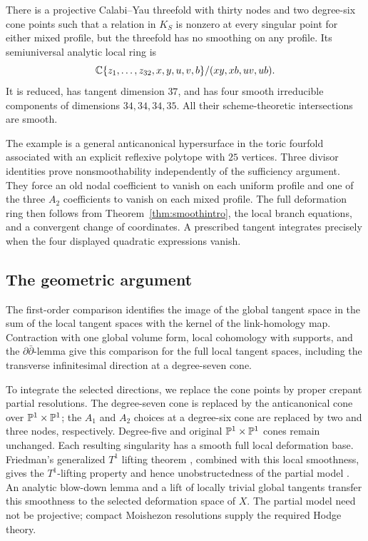 \begin{samepage}
\begin{thmletter}\label{thm:counterintro}
There is a projective Calabi--Yau threefold with thirty nodes and two
degree-six cone points such that a relation in $K_S$ is nonzero at every
singular point for either mixed profile, but the threefold has no
smoothing on any profile.  Its semiuniversal analytic local ring is
\[
 \mathbb{C}\{z_1,\ldots,z_{32},x,y,u,v,b\}/(xy,xb,uv,ub).
\]
It is reduced, has tangent dimension $37$, and has four smooth
irreducible components of dimensions $34,34,34,35$.  All their
scheme-theoretic intersections are smooth.
\end{thmletter}
\end{samepage}

The example is a general anticanonical hypersurface in the toric
fourfold associated with an explicit reflexive polytope with $25$
vertices.  Three divisor identities prove nonsmoothability independently
of the sufficiency argument.  They force an old nodal coefficient to
vanish on each uniform profile and one of the three $A_2$ coefficients
to vanish on each mixed profile.  The full deformation ring then follows
from Theorem~\ref{thm:smoothintro}, the local branch equations, and a
convergent change of coordinates.  A prescribed tangent integrates
precisely when the four displayed quadratic expressions vanish.

\subsection{The geometric argument}
The first-order comparison identifies the image of the global tangent
space in the sum of the local tangent spaces with the kernel of the
link-homology map.  Contraction with one global volume form, local
cohomology with supports, and the $\partial\bar\partial$-lemma give this
comparison for the full local tangent spaces, including the transverse
infinitesimal direction at a degree-seven cone.

To integrate the selected directions, we replace the cone points by
proper crepant partial resolutions.  The degree-seven cone is replaced
by the anticanonical cone over $\mathbb{P}^1\times\mathbb{P}^1$; the $A_1$ and $A_2$
choices at a degree-six cone are replaced by two and three nodes,
respectively.  Degree-five and original $\mathbb{P}^1\times\mathbb{P}^1$
cones remain unchanged.
Each resulting singularity has a smooth full local
deformation base.  Friedman's generalized $T^1$ lifting theorem
\cite[Thm.~3.10]{friedman2026}, combined with this local smoothness, gives the
$T^1$-lifting property and hence unobstructedness of the partial model
\cite[Thm.~3.3]{friedman2026}.  An analytic blow-down lemma and a lift of locally
trivial global tangents transfer this smoothness to the selected
deformation space of $X$.  The partial model need not be projective;
compact Moishezon resolutions supply the required Hodge theory.

